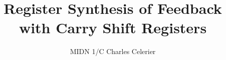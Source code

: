 \documentclass[english]{article}
\theoremstyle{plain}
\theoremstyle{definition}
\theoremstyle{remark}
\begin{document}
\title{Register Synthesis of Feedback with Carry Shift Registers}
\author{MIDN 1/C Charles Celerier}
\maketitle





\end{document}
